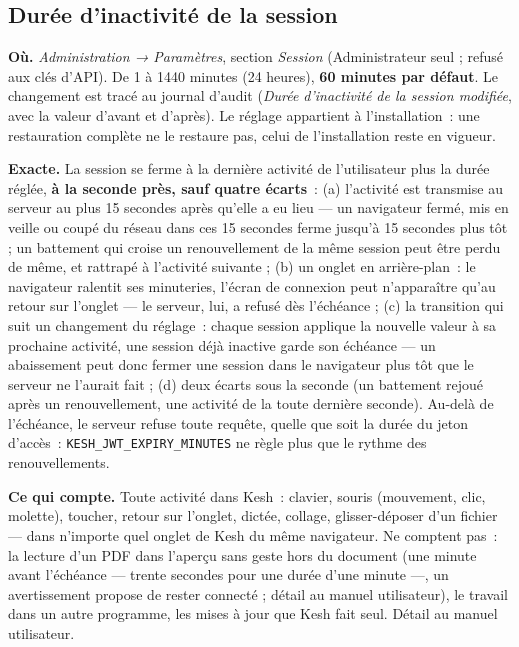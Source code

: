 \documentclass[a4paper,11pt,oneside]{article}
\begin{document}
\subsection{Durée d'inactivité de la session}\label{sec:duree-inactivite}

\begin{sloppypar}
\textbf{Où.} \emph{Administration → Paramètres}, section \emph{Session} (Administrateur seul ; refusé aux clés d'API). De 1 à 1440 minutes (24 heures), \textbf{60 minutes par défaut}. Le changement est tracé au journal d'audit (\emph{Durée d'inactivité de la session modifiée}, avec la valeur d'avant et d'après). Le réglage appartient à l'installation~: une restauration complète ne le restaure pas, celui de l'installation reste en vigueur.
\end{sloppypar}

\begin{sloppypar}
\textbf{Exacte.} La session se ferme à la dernière activité de l'utilisateur plus la durée réglée, \textbf{à la seconde près, sauf quatre écarts}~: (a) l'activité est transmise au serveur au plus 15 secondes après qu'elle a eu lieu --- un navigateur fermé, mis en veille ou coupé du réseau dans ces 15 secondes ferme jusqu'à 15 secondes plus tôt ; un battement qui croise un renouvellement de la même session peut être perdu de même, et rattrapé à l'activité suivante ; (b) un onglet en arrière-plan~: le navigateur ralentit ses minuteries, l'écran de connexion peut n'apparaître qu'au retour sur l'onglet --- le serveur, lui, a refusé dès l'échéance ; (c) la transition qui suit un changement du réglage~: chaque session applique la nouvelle valeur à sa prochaine activité, une session déjà inactive garde son échéance --- un abaissement peut donc fermer une session dans le navigateur plus tôt que le serveur ne l'aurait fait ; (d) deux écarts sous la seconde (un battement rejoué après un renouvellement, une activité de la toute dernière seconde). Au-delà de l'échéance, le serveur refuse toute requête, quelle que soit la durée du jeton d'accès~: \texttt{KESH\_JWT\_EXPIRY\_MINUTES} ne règle plus que le rythme des renouvellements.
\end{sloppypar}

\begin{sloppypar}
\textbf{Ce qui compte.} Toute activité dans Kesh~: clavier, souris (mouvement, clic, molette), toucher, retour sur l'onglet, dictée, collage, glisser-déposer d'un fichier --- dans n'importe quel onglet de Kesh du même navigateur. Ne comptent pas~: la lecture d'un PDF dans l'aperçu sans geste hors du document (une minute avant l'échéance --- trente secondes pour une durée d'une minute ---, un avertissement propose de rester connecté ; détail au manuel utilisateur), le travail dans un autre programme, les mises à jour que Kesh fait seul. Détail au manuel utilisateur.
\end{sloppypar}
\end{document}
